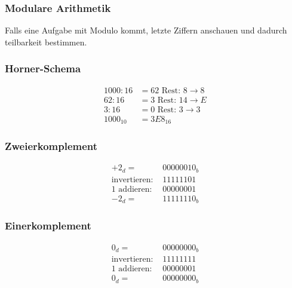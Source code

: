 \subsubsection{Modulare Arithmetik}
Falls eine Aufgabe mit Modulo kommt, letzte Ziffern anschauen und dadurch teilbarkeit bestimmen.

\begin{minipage}[t]{0.4\linewidth}
\subsubsection*{Horner-Schema}
	\begin{align*}
		1000 : 16 &= 62 \text{ Rest: }  8 \rightarrow 8\\
		62 : 16 &=  3 \text{ Rest: } 14 \rightarrow E\\
		3 : 16 &=  0 \text{ Rest: } 3 \rightarrow 3\\
		1000_10 &= 3E8_16
	\end{align*}

\subsubsection*{Zweierkomplement}
	\begin{align*}
		+2_d = &00000010_b\\
		\text{invertieren: } &11111101 \\
		\text{1 addieren: } &00000001 \\
		-2_d = &11111110_b
	\end{align*}
	
\subsubsection*{Einerkomplement}
	\begin{align*}
		0_d = &00000000_b\\
		\text{invertieren: } &11111111 \\
		\text{1 addieren: } &00000001 \\
		0_d = &00000000_b
	\end{align*}
\end{minipage}
\hfill
